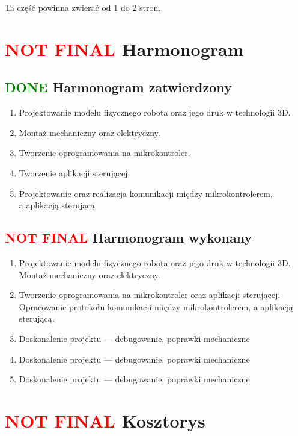 \documentclass[11pt,titlepage]{article}
\begin{document}
Ta część powinna zwierać od 1 do 2 stron.

\section{\textcolor{red}{NOT FINAL} Harmonogram}

\subsection{\textcolor{green}{DONE} Harmonogram zatwierdzony}

\begin{enumerate}
    \item Projektowanie modelu fizycznego robota oraz jego druk w technologii 3D.
    \item Montaż mechaniczny oraz elektryczny.
    \item Tworzenie oprogramowania na mikrokontroler.
    \item Tworzenie aplikacji sterującej.
    \item Projektowanie oraz realizacja komunikacji między mikrokontrolerem, \\a aplikacją sterującą.
\end{enumerate}

\subsection{\textcolor{red}{NOT FINAL} Harmonogram wykonany}

\begin{enumerate}
    \item Projektowanie modelu fizycznego robota oraz jego druk w technologii 3D. Montaż mechaniczny oraz elektryczny.
    \item Tworzenie oprogramowania na mikrokontroler oraz aplikacji sterującej. Opracowanie protokołu komunikacji między mikrokontrolerem, a aplikacją sterującą.
    \item Doskonalenie projektu — debugowanie, poprawki mechaniczne
    \item Doskonalenie projektu — debugowanie, poprawki mechaniczne
    \item Doskonalenie projektu — debugowanie, poprawki mechaniczne
\end{enumerate}

\section{\textcolor{red}{NOT FINAL} Kosztorys}
\end{document}

